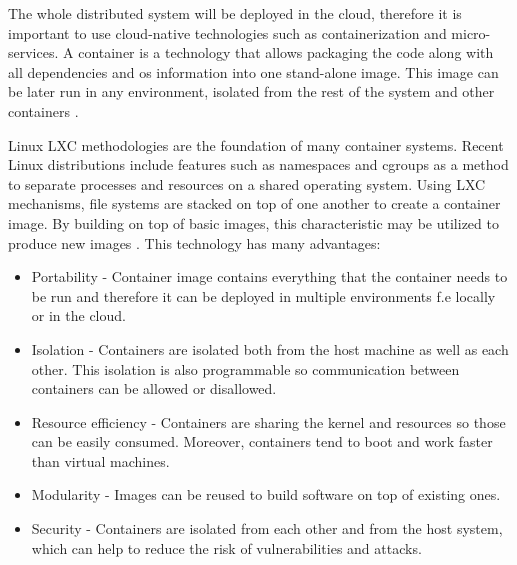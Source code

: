 The whole distributed system will be deployed in the cloud, therefore it is important to use cloud-native technologies such as containerization and micro-services. A container is a technology that allows packaging the code along with all dependencies and os information into one stand-alone image. This image can be later run in any environment, isolated from the rest of the system and other containers \cite{container_technologies}.

Linux LXC methodologies are the foundation of many container systems. Recent Linux distributions include features such as namespaces and cgroups as a method to separate processes and resources on a shared operating system. Using LXC mechanisms, file systems are stacked on top of one another to create a container image. By building on top of basic images, this characteristic may be utilized to produce new images \cite{container_technologies}. This technology has many advantages:
\begin{itemize}
    \item Portability - Container image contains everything that the container needs to be run and therefore it can be deployed in multiple environments f.e locally or in the cloud.

    \item  Isolation - Containers are isolated both from the host machine as well as each other. This isolation is also programmable so communication between containers can be allowed or disallowed.

    \item Resource efficiency - Containers are sharing the kernel and resources so those can be easily consumed. Moreover, containers tend to boot and work faster than virtual machines.
    
    \item Modularity - Images can be reused to build software on top of existing ones.
    
    \item Security - Containers are isolated from each other and from the host system, which can help to reduce the risk of vulnerabilities and attacks.
\end{itemize}